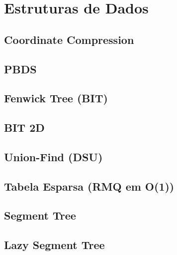 \section{Estruturas de Dados}

\subsection{Coordinate Compression}


\subsection{PBDS}


\subsection{Fenwick Tree (BIT)}


\subsection{BIT 2D}


\subsection{Union-Find (DSU)}


% 

\subsection{Tabela Esparsa (RMQ em O(1))}


\subsection{Segment Tree}


\subsection{Lazy Segment Tree}


